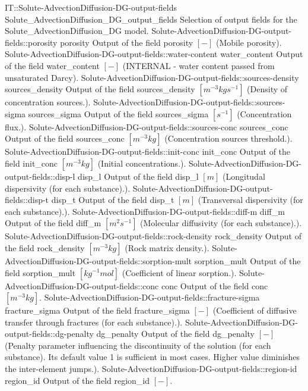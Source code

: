 \begin{SelectionType}
	{IT::Solute-AdvectionDiffusion-DG-output-fields}
	{Solute{\_}AdvectionDiffusion{\_}DG{\_}output{\_}fields}
	{{{Selection of output fields for the Solute{\_}AdvectionDiffusion{\_}DG model.}}}
		\SelectionItem
			{Solute-AdvectionDiffusion-DG-output-fields::porosity}
			{porosity}
			{{{Output of the field porosity }{$[-]$}{ (Mobile porosity).}}}
		\SelectionItem
			{Solute-AdvectionDiffusion-DG-output-fields::water-content}
			{water{\_}content}
			{{{Output of the field water{\_}content }{$[-]$}{ (INTERNAL - water content passed from unsaturated Darcy).}}}
		\SelectionItem
			{Solute-AdvectionDiffusion-DG-output-fields::sources-density}
			{sources{\_}density}
			{{{Output of the field sources{\_}density }{$[m^{-3}kgs^{-1}]$}{ (Density of concentration sources.).}}}
		\SelectionItem
			{Solute-AdvectionDiffusion-DG-output-fields::sources-sigma}
			{sources{\_}sigma}
			{{{Output of the field sources{\_}sigma }{$[s^{-1}]$}{ (Concentration flux.).}}}
		\SelectionItem
			{Solute-AdvectionDiffusion-DG-output-fields::sources-conc}
			{sources{\_}conc}
			{{{Output of the field sources{\_}conc }{$[m^{-3}kg]$}{ (Concentration sources threshold.).}}}
		\SelectionItem
			{Solute-AdvectionDiffusion-DG-output-fields::init-conc}
			{init{\_}conc}
			{{{Output of the field init{\_}conc }{$[m^{-3}kg]$}{ (Initial concentrations.).}}}
		\SelectionItem
			{Solute-AdvectionDiffusion-DG-output-fields::disp-l}
			{disp{\_}l}
			{{{Output of the field disp{\_}l }{$[m]$}{ (Longitudal dispersivity (for each substance).).}}}
		\SelectionItem
			{Solute-AdvectionDiffusion-DG-output-fields::disp-t}
			{disp{\_}t}
			{{{Output of the field disp{\_}t }{$[m]$}{ (Transversal dispersivity (for each substance).).}}}
		\SelectionItem
			{Solute-AdvectionDiffusion-DG-output-fields::diff-m}
			{diff{\_}m}
			{{{Output of the field diff{\_}m }{$[m^{2}s^{-1}]$}{ (Molecular diffusivity (for each substance).).}}}
		\SelectionItem
			{Solute-AdvectionDiffusion-DG-output-fields::rock-density}
			{rock{\_}density}
			{{{Output of the field rock{\_}density }{$[m^{-3}kg]$}{ (Rock matrix density.).}}}
		\SelectionItem
			{Solute-AdvectionDiffusion-DG-output-fields::sorption-mult}
			{sorption{\_}mult}
			{{{Output of the field sorption{\_}mult }{$[kg^{-1}mol]$}{ (Coefficient of linear sorption.).}}}
		\SelectionItem
			{Solute-AdvectionDiffusion-DG-output-fields::conc}
			{conc}
			{{{Output of the field conc }{$[m^{-3}kg]$}{.}}}
		\SelectionItem
			{Solute-AdvectionDiffusion-DG-output-fields::fracture-sigma}
			{fracture{\_}sigma}
			{{{Output of the field fracture{\_}sigma }{$[-]$}{ (Coefficient of diffusive transfer through fractures (for each substance).).}}}
		\SelectionItem
			{Solute-AdvectionDiffusion-DG-output-fields::dg-penalty}
			{dg{\_}penalty}
			{{{Output of the field dg{\_}penalty }{$[-]$}{ (Penalty parameter influencing the discontinuity of the solution (for each substance). Its default value 1 is sufficient in most cases. Higher value diminishes the inter-element jumps.).}}}
		\SelectionItem
			{Solute-AdvectionDiffusion-DG-output-fields::region-id}
			{region{\_}id}
			{{{Output of the field region{\_}id }{$[-]$}{.}}}
\end{SelectionType}
